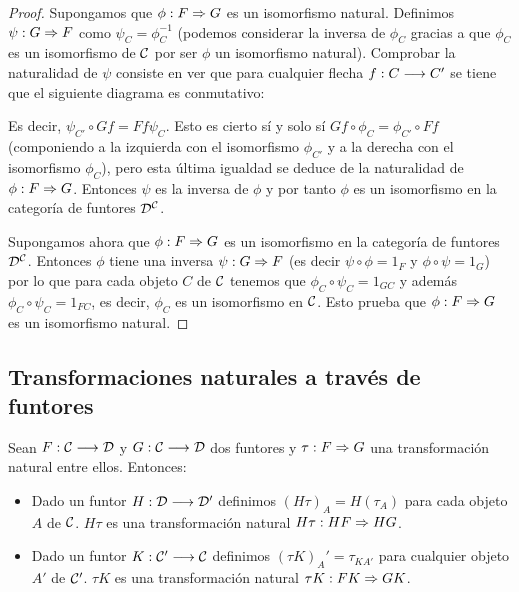 \begin{proof}
  Supongamos que $\phi: F\Rightarrow G$ es un isomorfismo natural. Definimos
  $\psi: G\Rightarrow F$ como $\psi_C = \phi_C^{-1}$ (podemos
  considerar la inversa de $\phi_C$ gracias a que $\phi_C$ es un isomorfismo de
  $\mathcal{C}$ por ser $\phi$ un isomorfismo natural). Comprobar la
  naturalidad de $\psi$ consiste en ver que para cualquier
  flecha $f: C\longrightarrow C'$ se tiene que el siguiente diagrama es
  conmutativo:
  \begin{center}
  \end{center}
  Es decir, $\psi_{C'} \circ Gf = Ff \psi_C$. Esto es cierto sí y solo
  sí $Gf \circ \phi_C = \phi_{C'} \circ Ff$ (componiendo a la izquierda
  con el isomorfismo $\phi_{C'}$ y a la derecha con el isomorfismo
  $\phi_C$), pero esta última igualdad se deduce de la naturalidad
  de $\phi: F\Rightarrow G$. Entonces
  $\psi$ es la inversa de $\phi$ y por tanto
  $\phi$ es un isomorfismo en la categoría de funtores
  $\mathcal{D}^{\mathcal{C}}$.


  Supongamos ahora que $\phi: F\Rightarrow G$ es un isomorfismo en la
  categoría de funtores $\mathcal{D}^{\mathcal{C}}$. Entonces $\phi$ tiene
  una inversa $\psi: G\Rightarrow F$ (es decir
  $\psi \circ \phi = 1_F$ y $\phi \circ \psi = 1_G$)
  por lo que para cada objeto
  $C$ de $\mathcal{C}$ tenemos que $\phi_C \circ \psi_C = 1_{GC}$ y
  además $\phi_C \circ \psi_C = 1_{FC}$, es decir, $\phi_C$
  es un isomorfismo en $\mathcal{C}$. Esto prueba que
  $\phi: F\Rightarrow G$ es un isomorfismo natural.
\end{proof}

\subsection{Transformaciones naturales a través de funtores}
Sean $F: \mathcal{C}\longrightarrow \mathcal{D}$ y $G: \mathcal{C}\longrightarrow \mathcal{D}$ dos funtores y
$\tau : F\Rightarrow G$ una transformación natural entre ellos.
Entonces:
\begin{itemize}
\item Dado un funtor $H: \mathcal{D}\longrightarrow \mathcal{D}'$ definimos
$(H\tau)_A = H(\tau_A)$ para cada objeto $A$ de
$\mathcal{C}$. $H\tau$ es una transformación natural
$H\tau : HF\Rightarrow HG$.
\item Dado un funtor $K: \mathcal{C}'\longrightarrow \mathcal{C}$ definimos
$(\tau K)_A' = \tau_{KA'}$ para cualquier objeto
$A'$ de $\mathcal{C}'$. $\tau K$ es una transformación natural
$\tau K : FK\Rightarrow GK$.
\end{itemize}
